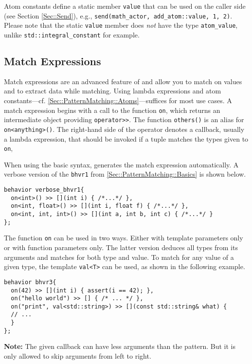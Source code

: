 Atom constants define a static member \lstinline^value^ that can be used on the caller side (see Section \ref{Sec::Send}), e.g., \lstinline^send(math_actor, add_atom::value, 1, 2)^.
Please note that the static \lstinline^value^ member does \emph{not} have the type \lstinline^atom_value^, unlike \lstinline^std::integral_constant^ for example.

\clearpage
\subsection{Match Expressions}

Match expressions are an advanced feature of \lib and allow you to match on values and to extract data while matching.
Using lambda expressions and atom constants---cf. \ref{Sec::PatternMatching::Atoms}---suffices for most use cases.
A match expression begins with a call to the function \lstinline^on^, which returns an intermediate object providing \lstinline^operator>>^.
The function \lstinline^others()^ is an alias for \lstinline^on<anything>()^.
The right-hand side of the operator denotes a callback, usually a lambda expression, that should be invoked if a tuple matches the types given to \lstinline^on^,

When using the basic syntax, \lib generates the match expression automatically.
A verbose version of the \lstinline^bhvr1^ from \ref{Sec::PatternMatching::Basics} is shown below.

\begin{lstlisting}
behavior verbose_bhvr1{
  on<int>() >> [](int i) { /*...*/ },
  on<int, float>() >> [](int i, float f) { /*...*/ },
  on<int, int, int>() >> [](int a, int b, int c) { /*...*/ }
};
\end{lstlisting}

The function \lstinline^on^ can be used in two ways.
Either with template parameters only or with function parameters only.
The latter version deduces all types from its arguments and matches for both type and value.
To match for any value of a given type, the template \lstinline^val<T>^ can be used, as shown in the following example.

\begin{lstlisting}
behavior bhvr3{
  on(42) >> [](int i) { assert(i == 42); },
  on("hello world") >> [] { /* ... */ },
  on("print", val<std::string>) >> [](const std::string& what) {
  // ...
  }
};
\end{lstlisting}

\textbf{Note:} The given callback can have less arguments than the pattern.
But it is only allowed to skip arguments from left to right.

